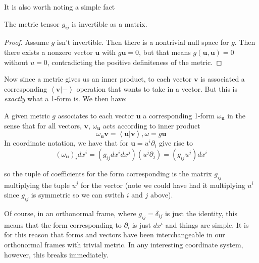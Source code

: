 	It is also worth noting a simple fact
	\begin{lemma}
		The metric tensor $g_{ij}$ is invertible as a matrix.
	\end{lemma}
	\begin{proof}
		Assume $g$ isn't invertible. Then there is a nontrivial null space for $g$. Then there exists a nonzero vector $\mathbf u$ with $g \mathbf u = 0$, but that means $g(\mathbf u, \mathbf u) = 0$ without $u=0$, contradicting the positive definiteness of the metric.
	\end{proof}
	Now since a metric gives us an inner product, to each vector $\mathbf v$ is associated a corresponding $\left< \mathbf v | - \right>$ operation that wants to take in a vector. But this is \emph{exactly} what a 1-form is. We then have:
	\begin{prop}
		A given metric $g$ associates to each vector $\mathbf u$ a corresponding 1-form $\omega_\mathbf{u}$ in the sense that for all vectors, $\mathbf v$, $\omega_\mathbf u$ acts according to inner product
		\begin{equation}
			\omega_\mathbf{u} \mathbf v =  \left< \mathbf u | \mathbf v \right>, \omega = g \mathbf u
		\end{equation}
		In coordinate notation, we have that for $\mathbf u = u^i \partial_i$ give rise to 
		\begin{equation}
			(\omega_\mathbf u)_i dx^i = (g_{ij} dx^i dx^j)(u^j \partial_j) = (g_{ij} u^j) dx^i
		\end{equation}
	\end{prop}
	so the tuple of coefficients for the form corresponding is the matrix $g_{ij}$ multiplying the tuple $u^j$ for the vector (note we could have had it multiplying $u^i$ since $g_{ij}$ is symmetric so we can switch $i$ and $j$ above). 
	
	Of course, in an orthonormal frame, where $g_{ij}=\delta_{ij}$ is just the identity, this means that the form corresponding to $\partial_i$ is just $dx^i$ and things are simple. It is for this reason that forms and vectors have been interchangeable in our orthonormal frames with trivial metric. In any interesting coordinate system, however, this breaks immediately. 
	
